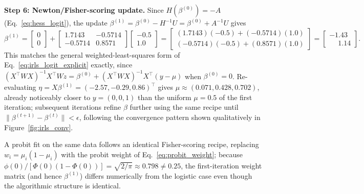 \documentclass[a4paper,11pt]{article}
\begin{document}
\textbf{Step 6: Newton/Fisher-scoring update.} Since $H(\beta^{(0)})=-A$ (Eq.~\eqref{eq:hess_logit}), the update $\beta^{(1)}=\beta^{(0)}-H^{-1}U = \beta^{(0)}+A^{-1}U$ gives
\begin{equation}
\beta^{(1)} = \begin{bmatrix}0\\0\end{bmatrix} +
\begin{bmatrix} 1.7143 & -0.5714 \\ -0.5714 & 0.8571 \end{bmatrix}
\begin{bmatrix}-0.5\\1.0\end{bmatrix}
= \begin{bmatrix} (1.7143)(-0.5)+(-0.5714)(1.0) \\ (-0.5714)(-0.5)+(0.8571)(1.0) \end{bmatrix}
= \begin{bmatrix}-1.43\\ \phantom{-}1.14\end{bmatrix}.
\end{equation}
This matches the general weighted-least-squares form of Eq.~\eqref{eq:irls_logit_explicit} exactly, since $(X^\top WX)^{-1}X^\top W z = \beta^{(0)}+(X^\top WX)^{-1}X^\top(y-\mu)$ when $\beta^{(0)}=0$. Re-evaluating $\eta=X\beta^{(1)}=(-2.57,-0.29,0.86)^\top$ gives $\mu\approx(0.071,0.428,0.702)$, already noticeably closer to $y=(0,0,1)$ than the uniform $\mu=0.5$ of the first iteration; subsequent iterations refine $\beta$ further using the same recipe until $\|\beta^{(t+1)}-\beta^{(t)}\|<\epsilon$, following the convergence pattern shown qualitatively in Figure~\ref{fig:irls_conv}.

A probit fit on the same data follows an identical Fisher-scoring recipe, replacing $w_i=\mu_i(1-\mu_i)$ with the probit weight of Eq.~\eqref{eq:probit_weight}; because $\phi(0)/[\Phi(0)(1-\Phi(0))] = \sqrt{2/\pi}\approx0.798 \ne 0.25$, the first-iteration weight matrix (and hence $\beta^{(1)}$) differs numerically from the logistic case even though the algorithmic structure is identical.

\end{document}
